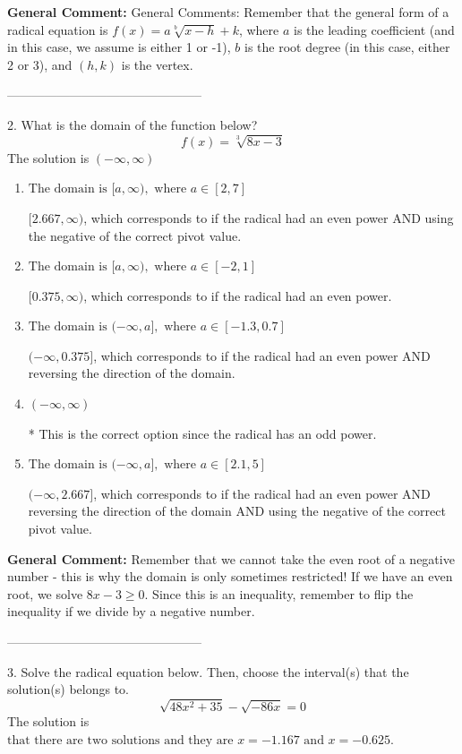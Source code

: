 \documentclass{extbook}[14pt]
\begin{document}
\textbf{General Comment:} General Comments: Remember that the general form of a radical equation is $ f(x) = a \sqrt[b]{x - h} + k $, where $a$ is the leading coefficient (and in this case, we assume is either 1 or -1), $b$ is the root degree (in this case, either 2 or 3), and $(h, k)$ is the vertex. 

-----------------------------------------------

2. What is the domain of the function below?
\[ f(x) = \sqrt[3]{8 x - 3} \] 
The solution is $ (-\infty, \infty) $ 

\begin{enumerate}[label=\Alph*.] 
\item $ \text{The domain is } [a, \infty), \text{   where } a \in [2, 7] $ 

 $[2.667, \infty)$, which corresponds to if the radical had an even power AND using the negative of the correct pivot value. 
\item $ \text{The domain is } [a, \infty), \text{   where } a \in [-2, 1] $ 

 $[0.375, \infty)$, which corresponds to if the radical had an even power. 
\item $ \text{The domain is } (-\infty, a], \text{   where } a \in [-1.3, 0.7] $ 

 $(-\infty, 0.375]$, which corresponds to if the radical had an even power AND reversing the direction of the domain. 
\item $ (-\infty, \infty) $ 

 * This is the correct option since the radical has an odd power. 
\item $ \text{The domain is } (-\infty, a], \text{   where } a \in [2.1, 5] $ 

 $(-\infty, 2.667]$, which corresponds to if the radical had an even power AND reversing the direction of the domain AND using the negative of the correct pivot value. 
\end{enumerate} 
 
\textbf{General Comment:} Remember that we cannot take the even root of a negative number - this is why the domain is only sometimes restricted! If we have an even root, we solve $8 x - 3 \geq 0$. Since this is an inequality, remember to flip the inequality if we divide by a negative number. 

-----------------------------------------------

3. Solve the radical equation below. Then, choose the interval(s) that the solution(s) belongs to.
\[ \sqrt{48 x^2 + 35} - \sqrt{-86 x} = 0 \] 
The solution is $ \text{that there are two solutions and they are } x = -1.167 \text{ and } x = -0.625. $ 
\end{document}
